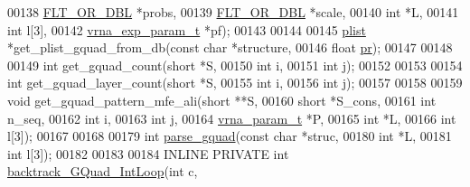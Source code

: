 \begin{DoxyCode}
00138                                    \hyperlink{group__data__structures_ga31125aeace516926bf7f251f759b6126}{FLT\_OR\_DBL}       *probs,
00139                                    \hyperlink{group__data__structures_ga31125aeace516926bf7f251f759b6126}{FLT\_OR\_DBL}       *scale,
00140                                    \textcolor{keywordtype}{int}              *L,
00141                                    \textcolor{keywordtype}{int}              l[3],
00142                                    \hyperlink{group__energy__parameters_structvrna__exp__param__s}{vrna\_exp\_param\_t} *pf);
00143 
00144 
00145 \hyperlink{group__struct__utils__plist_structvrna__elem__prob__s}{plist} *get\_plist\_gquad\_from\_db(\textcolor{keyword}{const} \textcolor{keywordtype}{char} *structure,
00146                                \textcolor{keywordtype}{float}      \hyperlink{fold__vars_8h_ac98ec419070aee6831b44e5c700f090f}{pr});
00147 
00148 
00149 \textcolor{keywordtype}{int}         get\_gquad\_count(\textcolor{keywordtype}{short} *S,
00150                             \textcolor{keywordtype}{int}   i,
00151                             \textcolor{keywordtype}{int}   j);
00152 
00153 
00154 \textcolor{keywordtype}{int}         get\_gquad\_layer\_count(\textcolor{keywordtype}{short} *S,
00155                                   \textcolor{keywordtype}{int}   i,
00156                                   \textcolor{keywordtype}{int}   j);
00157 
00158 
00159 \textcolor{keywordtype}{void} get\_gquad\_pattern\_mfe\_ali(\textcolor{keywordtype}{short}        **S,
00160                                \textcolor{keywordtype}{short}        *S\_cons,
00161                                \textcolor{keywordtype}{int}          n\_seq,
00162                                \textcolor{keywordtype}{int}          i,
00163                                \textcolor{keywordtype}{int}          j,
00164                                \hyperlink{group__energy__parameters_structvrna__param__s}{vrna\_param\_t} *P,
00165                                \textcolor{keywordtype}{int}          *L,
00166                                \textcolor{keywordtype}{int}          l[3]);
00167 
00168 
00179 \textcolor{keywordtype}{int} \hyperlink{group__gquads_gae41763215b9c64d2a7b67f0df8a28078}{parse\_gquad}(\textcolor{keyword}{const} \textcolor{keywordtype}{char}  *struc,
00180                 \textcolor{keywordtype}{int}         *L,
00181                 \textcolor{keywordtype}{int}         l[3]);
00182 
00183 
00184 INLINE PRIVATE \textcolor{keywordtype}{int} \hyperlink{group__gquads_ga220c41e8dbcee940ac975b8ce88e55c5}{backtrack\_GQuad\_IntLoop}(\textcolor{keywordtype}{int}          c,

\end{DoxyCode}
